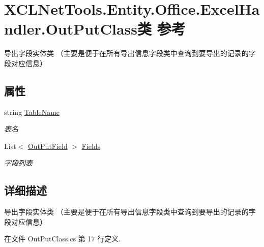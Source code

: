 \hypertarget{class_x_c_l_net_tools_1_1_entity_1_1_office_1_1_excel_handler_1_1_out_put_class}{}\section{X\+C\+L\+Net\+Tools.\+Entity.\+Office.\+Excel\+Handler.\+Out\+Put\+Class类 参考}
\label{class_x_c_l_net_tools_1_1_entity_1_1_office_1_1_excel_handler_1_1_out_put_class}


导出字段实体类 （主要是便于在所有导出信息字段类中查询到要导出的记录的字段对应信息）  


\subsection*{属性}
\begin{DoxyCompactItemize}
\item 
string \hyperlink{class_x_c_l_net_tools_1_1_entity_1_1_office_1_1_excel_handler_1_1_out_put_class_afdbc40e9ef162503cbf1ebea55728c59}{Table\+Name}
\begin{DoxyCompactList}\small\item\em 表名 \end{DoxyCompactList}\item 
List$<$ \hyperlink{class_x_c_l_net_tools_1_1_entity_1_1_office_1_1_excel_handler_1_1_out_put_field}{Out\+Put\+Field} $>$ \hyperlink{class_x_c_l_net_tools_1_1_entity_1_1_office_1_1_excel_handler_1_1_out_put_class_a3efddb66ca15bab7aa2b15f80d59fa06}{Fields}
\begin{DoxyCompactList}\small\item\em 字段列表 \end{DoxyCompactList}\end{DoxyCompactItemize}


\subsection{详细描述}
导出字段实体类 （主要是便于在所有导出信息字段类中查询到要导出的记录的字段对应信息） 



在文件 Out\+Put\+Class.\+cs 第 17 行定义.



